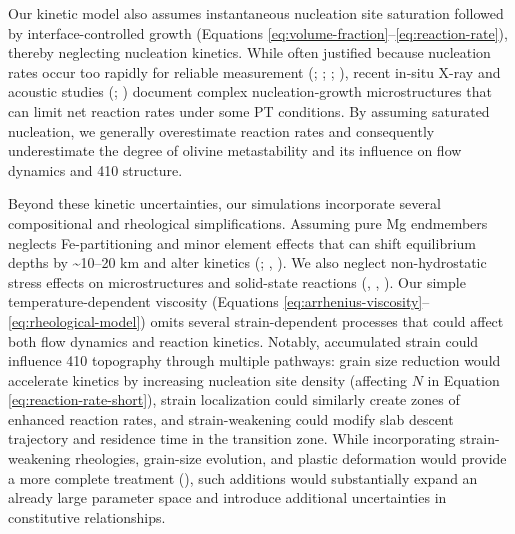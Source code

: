 \documentclass[
  paper=a4,
  ,captions=tableheading
]{scrartcl}
\begin{document}
Our kinetic model also assumes instantaneous nucleation site saturation
followed by interface-controlled growth (Equations
\ref{eq:volume-fraction}--\ref{eq:reaction-rate}), thereby neglecting
nucleation kinetics. While often justified because nucleation rates
occur too rapidly for reliable measurement
(;
;
;
), recent in-situ
X-ray and acoustic studies (; ) document complex
nucleation-growth microstructures that can limit net reaction rates
under some PT conditions. By assuming saturated nucleation, we generally
overestimate reaction rates and consequently underestimate the degree of
olivine metastability and its influence on flow dynamics and 410
structure.

Beyond these kinetic uncertainties, our simulations incorporate several
compositional and rheological simplifications. Assuming pure Mg
endmembers neglects Fe-partitioning and minor element effects that can
shift equilibrium depths by \textasciitilde10--20 km and alter kinetics
(;
,
). We also neglect non-hydrostatic
stress effects on microstructures and solid-state reactions
(,
, ). Our
simple temperature-dependent viscosity (Equations
\ref{eq:arrhenius-viscosity}--\ref{eq:rheological-model}) omits several
strain-dependent processes that could affect both flow dynamics and
reaction kinetics. Notably, accumulated strain could influence 410
topography through multiple pathways: grain size reduction would
accelerate kinetics by increasing nucleation site density (affecting
\(N\) in Equation \ref{eq:reaction-rate-short}), strain localization
could similarly create zones of enhanced reaction rates, and
strain-weakening could modify slab descent trajectory and residence time
in the transition zone. While incorporating strain-weakening rheologies,
grain-size evolution, and plastic deformation would provide a more
complete treatment (),
such additions would substantially expand an already large parameter
space and introduce additional uncertainties in constitutive
relationships.
\end{document}
